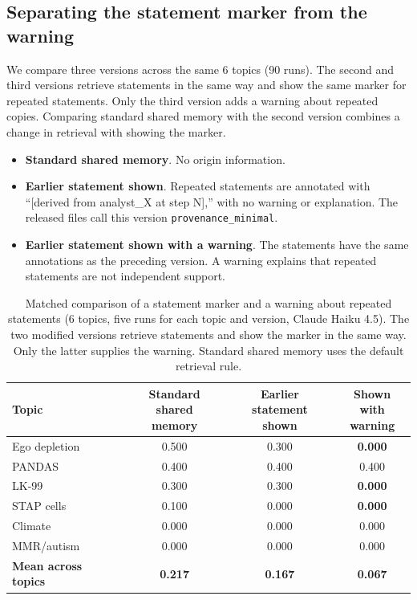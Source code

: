 \subsection{Separating the statement marker from the warning}

We compare three versions across the same 6 topics (90 runs). The second and third versions retrieve statements in the same way and show the same marker for repeated statements. Only the third version adds a warning about repeated copies. Comparing standard shared memory with the second version combines a change in retrieval with showing the marker.

\begin{itemize}
\item \textbf{Standard shared memory}. No origin information.
\item \textbf{Earlier statement shown}. Repeated statements are annotated with ``[derived from analyst\_X at step N],'' with no warning or explanation. The released files call this version \texttt{provenance\_minimal}.
\item \textbf{Earlier statement shown with a warning}. The statements have the same annotations as the preceding version. A warning explains that repeated statements are not independent support.
\end{itemize}

\begin{table}[h]
\caption{Matched comparison of a statement marker and a warning about repeated statements (6 topics, five runs for each topic and version, Claude Haiku 4.5). The two modified versions retrieve statements and show the marker in the same way. Only the latter supplies the warning. Standard shared memory uses the default retrieval rule.}
\label{tab:provenance_ablation}
\begin{center}
\begin{tabular}{lccc}
\toprule
Topic & \shortstack{Standard shared\\memory} & \shortstack{Earlier statement\\shown} & \shortstack{Shown with\\warning} \\
\midrule
Ego depletion & 0.500 & 0.300 & \textbf{0.000} \\
PANDAS & 0.400 & 0.400 & 0.400 \\
LK-99 & 0.300 & 0.300 & \textbf{0.000} \\
STAP cells & 0.100 & 0.000 & \textbf{0.000} \\
Climate & 0.000 & 0.000 & 0.000 \\
MMR/autism & 0.000 & 0.000 & 0.000 \\
\midrule
\textbf{Mean across topics} & \textbf{0.217} & \textbf{0.167} & \textbf{0.067} \\
\bottomrule
\end{tabular}
\end{center}
\end{table}

